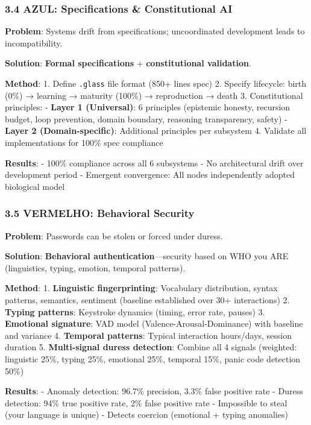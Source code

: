 \documentclass[
]{article}
\begin{document}
\subsubsection{3.4 AZUL: Specifications \& Constitutional
AI}\label{azul-specifications-constitutional-ai}

\textbf{Problem}: Systems drift from specifications; uncoordinated
development leads to incompatibility.

\textbf{Solution}: \textbf{Formal specifications} +
\textbf{constitutional validation}.

\textbf{Method}: 1. Define \texttt{.glass} file format (850+ lines spec)
2. Specify lifecycle: birth (0\%) → learning → maturity (100\%) →
reproduction → death 3. Constitutional principles: - \textbf{Layer 1
(Universal)}: 6 principles (epistemic honesty, recursion budget, loop
prevention, domain boundary, reasoning transparency, safety) -
\textbf{Layer 2 (Domain-specific)}: Additional principles per subsystem
4. Validate all implementations for 100\% spec compliance

\textbf{Results}: - 100\% compliance across all 6 subsystems - No
architectural drift over development period - Emergent convergence: All
nodes independently adopted biological model

\subsubsection{3.5 VERMELHO: Behavioral
Security}\label{vermelho-behavioral-security}

\textbf{Problem}: Passwords can be stolen or forced under duress.

\textbf{Solution}: \textbf{Behavioral authentication}---security based
on WHO you ARE (linguistics, typing, emotion, temporal patterns).

\textbf{Method}: 1. \textbf{Linguistic fingerprinting}: Vocabulary
distribution, syntax patterns, semantics, sentiment (baseline
established over 30+ interactions) 2. \textbf{Typing patterns}:
Keystroke dynamics (timing, error rate, pauses) 3. \textbf{Emotional
signature}: VAD model (Valence-Arousal-Dominance) with baseline and
variance 4. \textbf{Temporal patterns}: Typical interaction hours/days,
session duration 5. \textbf{Multi-signal duress detection}: Combine all
4 signals (weighted: linguistic 25\%, typing 25\%, emotional 25\%,
temporal 15\%, panic code detection 50\%)

\textbf{Results}: - Anomaly detection: 96.7\% precision, 3.3\% false
positive rate - Duress detection: 94\% true positive rate, 2\% false
positive rate - Impossible to steal (your language is unique) - Detects
coercion (emotional + typing anomalies)
\end{document}
